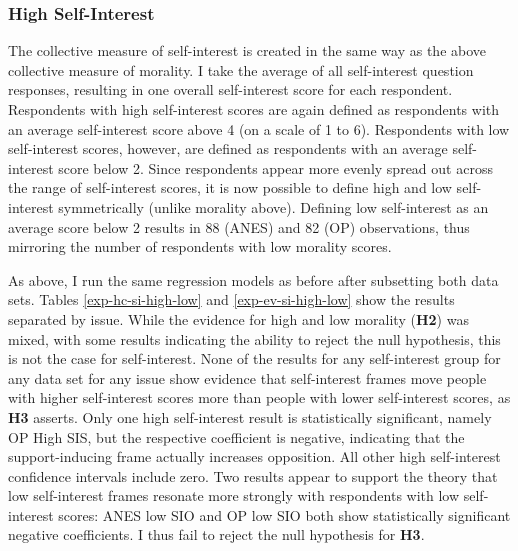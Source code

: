 \documentclass[12pt,econ]{sources/authesis}
\begin{document}
\dsp

\normalsize

\hypertarget{framing-results-experiment-si-high}{%
\subsubsection{High Self-Interest}\label{framing-results-experiment-si-high}}

The collective measure of self-interest is created in the same way as the above collective measure of morality. I take the average of all self-interest question responses, resulting in one overall self-interest score for each respondent. Respondents with high self-interest scores are again defined as respondents with an average self-interest score above 4 (on a scale of 1 to 6). Respondents with low self-interest scores, however, are defined as respondents with an average self-interest score below 2. Since respondents appear more evenly spread out across the range of self-interest scores, it is now possible to define high and low self-interest symmetrically (unlike morality above). Defining low self-interest as an average score below 2 results in 88 (ANES) and 82 (OP) observations, thus mirroring the number of respondents with low morality scores.

As above, I run the same regression models as before after subsetting both data sets. Tables \ref{exp-hc-si-high-low} and \ref{exp-ev-si-high-low} show the results separated by issue. While the evidence for high and low morality (\textbf{H2}) was mixed, with some results indicating the ability to reject the null hypothesis, this is not the case for self-interest. None of the results for any self-interest group for any data set for any issue show evidence that self-interest frames move people with higher self-interest scores more than people with lower self-interest scores, as \textbf{H3} asserts. Only one high self-interest result is statistically significant, namely OP High SIS, but the respective coefficient is negative, indicating that the support-inducing frame actually increases opposition. All other high self-interest confidence intervals include zero. Two results appear to support the theory that low self-interest frames resonate more strongly with respondents with low self-interest scores: ANES low SIO and OP low SIO both show statistically significant negative coefficients. I thus fail to reject the null hypothesis for \textbf{H3}.

\ssp

\footnotesize
\end{document}
